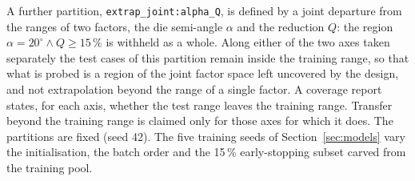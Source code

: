 \documentclass[subscriptcorrection,upint,varvw,barcolor=Goldenrod3,mathalfa=cal=euler,balance,hyphenate,french,pdf-a]{asmejour} %
\begin{document}
A further partition, \texttt{extrap\_joint:alpha\_Q}, is defined by a joint departure from the ranges of two factors, the die semi-angle $\alpha$ and the reduction $Q$: the region $\alpha = 20^\circ \wedge Q \ge 15\,\%$ is withheld as a whole. Along either of the two axes taken separately the test cases of this partition remain inside the training range, so that what is probed is a region of the joint factor space left uncovered by the design, and not extrapolation beyond the range of a single factor. %
A coverage report states, for each axis, whether the test range leaves the training range. Transfer beyond the training range is claimed only for those axes for which it does. %
The partitions are fixed (seed 42). The five training seeds of Section~\ref{sec:models} vary the initialisation, the batch order and the 15\,\% early-stopping subset carved from the training pool. %
\end{document}
